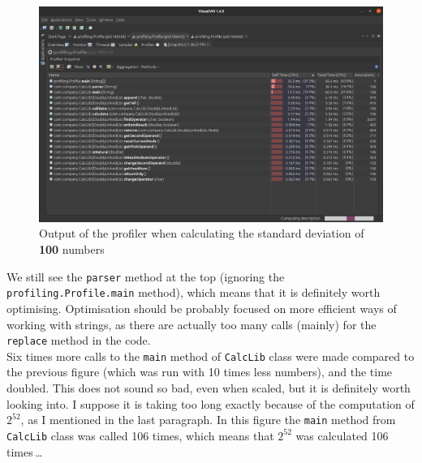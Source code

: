 \documentclass[12pt]{article}
\begin{document}
    \newpage

    \begin{figure}[h]
      \begin{center}
        \includegraphics[width=16cm]{profiling_result-100_numbers.eps}
        \caption{Output of the profiler when calculating the standard deviation of \textbf{100} numbers}
      \end{center}
    \end{figure}

    We still see the \texttt{parser} method at the top (ignoring the 
    \texttt{profiling.Profile.main} method), which means that it is definitely worth
    optimising. Optimisation should be probably focused on more efficient ways 
    of working with strings, as there are actually too many calls (mainly) for 
    the \texttt{replace} method in the code. \\

    Six times more calls to the \texttt{main} method of \texttt{CalcLib} class were
    made compared to the previous figure (which was run with 10 times less 
    numbers), and the time doubled. This does not sound so bad, even when 
    scaled, but it is definitely worth looking into. I suppose
    it is taking too long exactly because of the computation of $2^{52}$, as
    I mentioned in the last paragraph. In this figure the \texttt{main} method from
    \texttt{CalcLib} class was called 106 times, which means that $2^{52}$ was calculated
    106 times\,\dots

    \newpage
\end{document}
